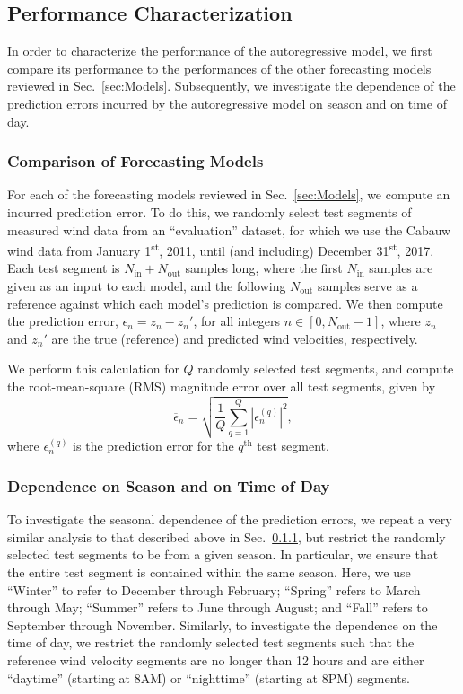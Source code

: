 \documentclass[11pt, oneside]{article}
\newcommand{\secref}[1]{Sec.~\ref{#1}}
\begin{document}
\subsection{Performance Characterization}
In order to characterize the performance of the autoregressive model, we first compare its performance to the performances of the other forecasting models reviewed in \secref{sec:Models}.
Subsequently, we investigate the dependence of the prediction errors incurred by the autoregressive model on season and on time of day.

\subsubsection{Comparison of Forecasting Models}\label{sec:Methodology:Comparison}
For each of the forecasting models reviewed in \secref{sec:Models}, we compute an incurred prediction error.
To do this, we randomly select test segments of measured wind data from an ``evaluation'' dataset, for which we use the Cabauw wind data from January 1\textsuperscript{st}, 2011, until (and including) December 31\textsuperscript{st}, 2017.
Each test segment is $N_\text{in} + N_\text{out}$ samples long, where the first $N_\text{in}$ samples are given as an input to each model, and the following $N_\text{out}$ samples serve as a reference against which each model's prediction is compared.
We then compute the prediction error, $\epsilon_n = z_n - z_n'$, for all integers $n \in [0,N_\text{out}-1]$, where $z_n$ and $z_n'$ are the true (reference) and predicted wind velocities, respectively.

We perform this calculation for $Q$ randomly selected test segments, and compute the root-mean-square (RMS) magnitude error over all test segments, given by
\begin{equation}\label{eq:RMSE}
\overline{\epsilon}_n = \sqrt{ \frac{1}{Q} \sum_{q = 1}^Q \left| \epsilon_n^{(q)} \right|^2 },
\end{equation}
where $\epsilon_n^{(q)}$ is the prediction error for the $q^\text{th}$ test segment.

\subsubsection{Dependence on Season and on Time of Day}\label{sec:Methodology:SeasonalAndDiurnalDependence}
To investigate the seasonal dependence of the prediction errors, we repeat a very similar analysis to that described above in \secref{sec:Methodology:Comparison}, but restrict the randomly selected test segments to be from a given season.
In particular, we ensure that the entire test segment is contained within the same season.
Here, we use ``Winter'' to refer to December through February;
``Spring'' refers to March through May;
``Summer'' refers to June through August; and
``Fall'' refers to September through November.
Similarly, to investigate the dependence on the time of day, we restrict the randomly selected test segments such that the reference wind velocity segments are no longer than 12 hours and are either ``daytime'' (starting at 8AM) or ``nighttime'' (starting at 8PM) segments.
\end{document}
